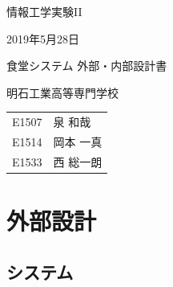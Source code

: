 \documentclass[a4paper]{ltjsarticle}
\begin{document}

\large
\vspace{-5.0cm}
\hspace{-1.0cm}
情報工学実験II

\hspace{-1.0cm}
2019年5月28日

\Huge
\vspace{1.0cm}
\begin{center}
    食堂システム 外部・内部設計書
\end{center}

\vspace{0.5cm}
\begin{center}
    \LARGE
    明石工業高等専門学校
\end{center}

\LARGE
\begin{center}
    \begin{tabular}{rl}
        E1507 & 泉 和哉 \\
        E1514 & 岡本 一真 \\
        E1533 & 西 総一朗
    \end{tabular}
\end{center}

\normalsize

\tableofcontents
\thispagestyle{empty}
\clearpage
\setcounter{page}{1}


\section{外部設計}
\subsection{システム}
\end{document}
